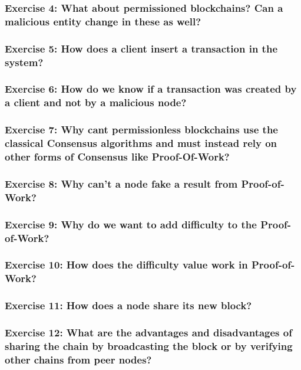 \documentclass[12pt,a4paper]{article}
\theoremstyle{definition}
\begin{document}
\subsubsection*{Exercise 4: What about permissioned blockchains? Can a malicious entity change in these as well?}

\subsubsection*{Exercise 5: How does a client insert a transaction in the system?
}

\subsubsection*{Exercise 6: How do we know if a transaction was created by a client and not by a malicious node?}


\subsubsection*{Exercise 7: Why cant permissionless blockchains use the classical Consensus algorithms and must instead rely on other forms of Consensus like Proof-Of-Work?}

\subsubsection*{Exercise 8: Why can't a node fake a result from Proof-of-Work?}

\subsubsection*{Exercise 9: Why do we want to add difficulty to the Proof-of-Work?}

\subsubsection*{Exercise 10: How does the difficulty value work in Proof-of-Work?}


\subsubsection*{Exercise 11: How does a node share its new block?}

\subsubsection*{Exercise 12: What are the advantages and disadvantages of sharing the chain by broadcasting the block or by verifying other chains from peer nodes?}
\end{document}
